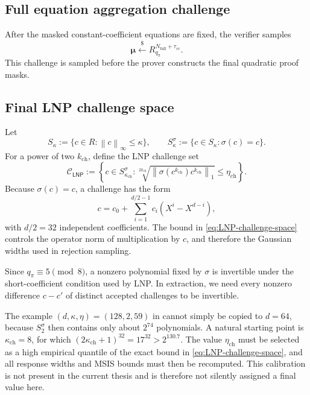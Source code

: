 \documentclass[11pt,a4paper]{article}
\newcommand{\Rpi}{R_{q_{\pi}}}
\newcommand{\proofmod}{q_{\pi}}
\newcommand{\LNP}{\mathsf{LNP}}
\newcommand{\norm}[1]{\left\lVert #1\right\rVert}
\newcommand{\getsr}{\xleftarrow{\$}}
\newcommand{\calC}{\mathcal{C}}
\begin{document}
\subsection{Full equation aggregation challenge}

After the masked constant-coefficient equations are fixed, the verifier samples
\begin{equation}
  \boldsymbol\mu\getsr
  \Rpi^{N_{\mathrm{full}}+\tau_{\mathrm{cc}}}.
  \label{eq:mu-challenge}
\end{equation}
This challenge is sampled before the prover constructs the final quadratic
proof masks.

\subsection{Final LNP challenge space}

Let
\[
  S_\kappa:=\{c\in R:\norm{c}_\infty\le\kappa\},
  \qquad
  S_\kappa^\sigma:=\{c\in S_\kappa:\sigma(c)=c\}.
\]
For a power of two \(k_{\mathrm{ch}}\), define the LNP challenge set
\begin{equation}
 \calC_{\LNP}:=
 \left\{
 c\in S_{\kappa_{\mathrm{ch}}}^{\sigma}:
 \sqrt[2k_{\mathrm{ch}}]{
   \norm{\sigma(c^{k_{\mathrm{ch}}})c^{k_{\mathrm{ch}}}}_1
 }
 \le\eta_{\mathrm{ch}}
 \right\}.
 \label{eq:LNP-challenge-space}
\end{equation}
Because \(\sigma(c)=c\), a challenge has the form
\begin{equation}
 c=c_0+\sum_{i=1}^{d/2-1}c_i(X^i-X^{d-i}),
 \label{eq:sigma-fixed-c}
\end{equation}
with \(d/2=32\) independent coefficients.  The bound in
\cref{eq:LNP-challenge-space} controls the operator norm of multiplication by
\(c\), and therefore the Gaussian widths used in rejection sampling.

Since \(\proofmod\equiv5\pmod8\), a nonzero polynomial fixed by \(\sigma\) is
invertible under the short-coefficient condition used by LNP.  In extraction,
we need every nonzero difference \(c-c'\) of distinct accepted challenges to
be invertible.

\begin{importantbox}[A concrete \(d=64\) LNP challenge is still an implementation parameter]
The example \((d,\kappa,\eta)=(128,2,59)\) in \cite{LNP22} cannot simply be
copied to \(d=64\), because \(S_2^\sigma\) then contains only about \(2^{74}\)
polynomials.  A natural starting point is
\(\kappa_{\mathrm{ch}}=8\), for which
\((2\kappa_{\mathrm{ch}}+1)^{32}=17^{32}>2^{130.7}\).
The value \(\eta_{\mathrm{ch}}\) must be selected as a high empirical quantile
of the exact bound in \cref{eq:LNP-challenge-space}, and all response widths
and MSIS bounds must then be recomputed.  This calibration is not present in
the current thesis and is therefore not silently assigned a final value here.
\end{importantbox}
\end{document}
